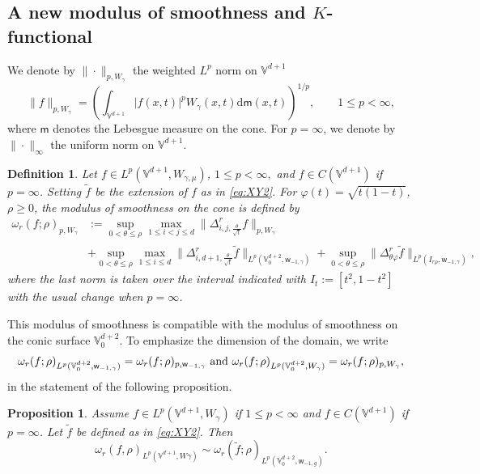 \documentclass{amsart}
\newtheorem{prop}[thm]{Proposition}
\newtheorem{defn}[thm]{Definition}
\theoremstyle{remark}
\def\d{\mathrm{d}}
\def\g{{\gamma}}
\def\t{{\theta}}
\def\o{{\omega}}
\def\VV{{\mathbb V}}
\def\d{\mathrm{d}}
\def\sm{{\mathsf m}}
\def\sw{{\mathsf w}}
\def\g{{\gamma}}
\def\t{{\theta}}
\def\o{{\omega}}
\def\VV{{\mathbb V}}
\newcommand{\wt}{\widetilde}
\def\f{\frac}
\def\f{\frac}
\begin{document}
\subsection{A new modulus of smoothness and $K$-functional}%
We denote by $\|\cdot\|_{p,W_\g}$ the weighted $L^p$ norm on $\VV^{d+1}$
$$
\|f\|_{p,W_\g} = \left( \int_{\VV^{d+1}} | f(x,t)|^p W_{\g}(x,t) \d \sm (x,t)\right)^{1/p}, \qquad 1 \le p < \infty, 
$$
where $\sm$ denotes the Lebesgue measure on the cone. For $ p =\infty$, we denote by $\|\cdot\|_\infty$ the 
uniform norm on $\VV^{d+1}$.  

\begin{defn}\label{def:modulusV}
Let $f\in L^p(\VV^{d+1}, W_{\g,\mu})$, $1\leq p <  \infty,$ and $f\in C(\VV^{d+1})$ if $p=\infty$. 
Setting $\tilde{f}$ be the extension of $f$ as in \eqref{eq:XY2}.  For $\varphi(t)=\sqrt{t(1-t)}$, $\rho \geq 0$, the modulus of smoothness on the cone is defined by 
\begin{align*}
\o_r(f; \rho)_{p,W_{\g}}   &:= \sup_{0 < \t \le \rho}   \max_{1\leq i < j \leq d }
	\Big \| \Delta_{i,j,\f{\t}{\sqrt{t}}}^r f\Big\|_{p, W_{\g}} \\
   & + \sup_{0 < \t \le \rho}   \max_{1\leq i  \leq d }\Big \| \Delta_{i,d+1,\f{\t}{\sqrt{t}}}^r \tilde{f}\Big\|_{L^p(\VV_0^{d+2},\sw_{-1,\g})  } 
      + \sup_{0<\t \le \rho} \Big\| \Delta_{\t\varphi}^r \tilde{f}\Big\|_{L^p(I_{r\rho},\sw_{-1,\g}) } ,
\end{align*} 
where the last  norm is taken over the interval indicated with $I_{t}:=[t^2,1-t^2]$ with the usual change when $p=\infty$. 
\end{defn} 

This modulus of smoothness is compatible with the modulus of smoothness on the conic surface $\VV_0^{d+2}$. 
To emphasize the dimension of the domain, we write
$$
\o_r(f; \rho)_{L^p(\VV_0^{d+2},  \sw_{-1,\g})} = \o_r(f; \rho)_{p,\sw_{-1,\g}}   \, \, \hbox{and} \, \, 
  \o_r(f; \rho)_{L^p(\VV_0^{d+2}, W_\g)} =\o_r(f; \rho)_{p,W_\g},
$$
in the statement of the following proposition. 

\begin{prop} \label{prop:moduli-equ}
Assume $f \in L^p(\VV^{d+1}, W_\g)$ if $1\le p < \infty$ and $f \in C(\VV^{d+1})$ if $p = \infty$. Let $\wt f$ be defined
as in \eqref{eq:XY2}. Then 
$$
 \o_r(f, \rho)_{L^p(\VV^{d+1}, W\g)} \sim   \o_r (\wt f; \rho)_{L^p(\VV_0^{d+2}, \sw_{-1,g})}.
$$
\end{prop}
\end{document}
